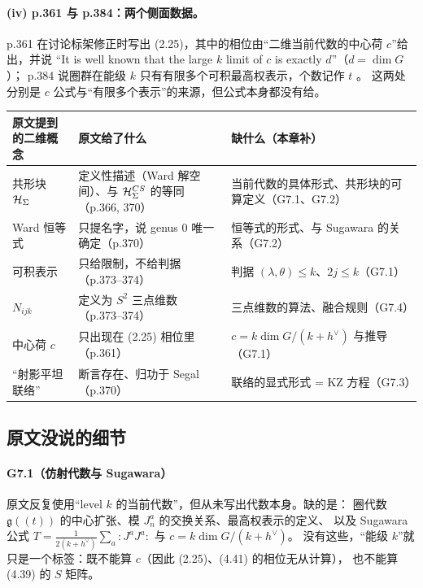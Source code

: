 \paragraph{(iv) p.361 与 p.384：两个侧面数据。}
p.361 在讨论标架修正时写出 (2.25)，其中的相位由“二维当前代数的中心荷 $c$”给出，并说
“It is well known that the large $k$ limit of $c$ is exactly $d$”（$d=\dim G$）；
p.384 说圈群在能级 $k$ 只有有限多个可积最高权表示，个数记作 $t$ 。
这两处分别是 $c$ 公式与“有限多个表示”的来源，但公式本身都没有给。

\begin{center}
\small
\begin{tabular}{@{}p{3.1cm}p{5.4cm}p{5.2cm}@{}}
\toprule
原文提到的二维概念 & 原文给了什么 & 缺什么（本章补） \\
\midrule
共形块 $\mathcal{H}_\Sigma$ & 定义性描述（Ward 解空间）、与 $\mathcal{H}_\Sigma^{CS}$ 的等同（p.366, 370） & 当前代数的具体形式、共形块的可算定义（G7.1、G7.2）\\
Ward 恒等式 & 只提名字，说 genus $0$ 唯一确定（p.370） & 恒等式的形式、与 Sugawara 的关系（G7.2）\\
可积表示 & 只给限制，不给判据（p.373--374） & 判据 $(\lambda,\theta)\le k$、$2j\le k$（G7.1）\\
$N_{ijk}$ & 定义为 $S^2$ 三点维数（p.373--374） & 三点维数的算法、融合规则（G7.4）\\
中心荷 $c$ & 只出现在 (2.25) 相位里（p.361） & $c=k\dim G/(k+h^\vee)$ 与推导（G7.1）\\
“射影平坦联络” & 断言存在、归功于 Segal（p.370） & 联络的显式形式 = KZ 方程（G7.3）\\
\bottomrule
\end{tabular}
\end{center}

\subsection{原文没说的细节}

\paragraph{G7.1（仿射代数与 Sugawara）}
原文反复使用“level $k$ 的当前代数”，但从未写出代数本身。缺的是：
圈代数 $\mathfrak g((t))$ 的中心扩张、模 $J^a_n$ 的交换关系、最高权表示的定义、
以及 Sugawara 公式 $T=\frac{1}{2(k+h^\vee)}\sum_a{:}J^aJ^a{:}$ 与 $c=k\dim G/(k+h^\vee)$。
没有这些，“能级 $k$”就只是一个标签：既不能算 $c$（因此 (2.25)、(4.41) 的相位无从计算），
也不能算 (4.39) 的 $S$ 矩阵。

